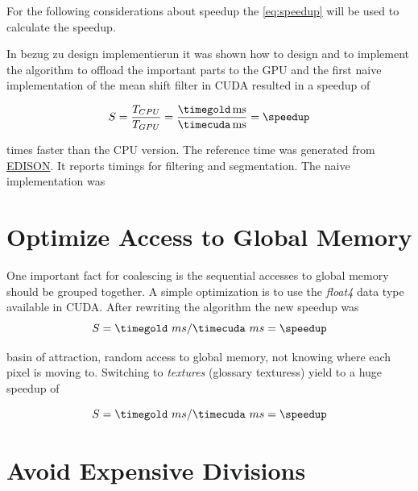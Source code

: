 For the following considerations about speedup the \autoref{eq:speedup} will be
used to calculate the speedup. 

In {\color{red} bezug zu design implementierun} it was shown how to design and
to implement the algorithm to offload the important parts to the \gls{GPU} and
the first naive implementation of the mean shift filter in \gls{CUDA} resulted
in a speedup of

\begin{equation*}\label{eq:speedup0}
	S = \frac{T_{CPU}}{T_{GPU}} = %
	\frac{\unit[\timegold]{ms}}{\unit[\timecuda]{ms}} = \speedup
\end{equation*}

times faster than the \gls{CPU} version. The reference time was generated from
\href{http://www.caip.rutgers.edu/riul/research/code.html}{ \gls{EDISON}}. It
reports timings for filtering and segmentation.
 The naive implementation was 

\section*{Optimize Access to Global Memory}
\label{sec:coalescing}

One important fact for coalescing is the sequential accesses to global memory
should be grouped together. A simple optimization is to use the \emph{float4}
data type available in \gls{CUDA}. After rewriting the algorithm the new speedup
was 
\fpDiv{\speedup}{\timegold}{\timecuda}
\begin{equation*}\label{eq:speedup0}
	S = \timegold\ ms/\timecuda\ ms = \speedup
\end{equation*}

basin of attraction, random access to global memory, not knowing where each pixel
is moving to. Switching to \emph{textures} (glossary texturess) yield to a huge
speedup of 

\fpDiv{\speedup}{\timegold}{\timecuda}
\begin{equation*}\label{eq:speedup0}
	S = \timegold\ ms/\timecuda\ ms = \speedup
\end{equation*}


\section*{Avoid Expensive Divisions}
\label{sec:expensive_divisions}

